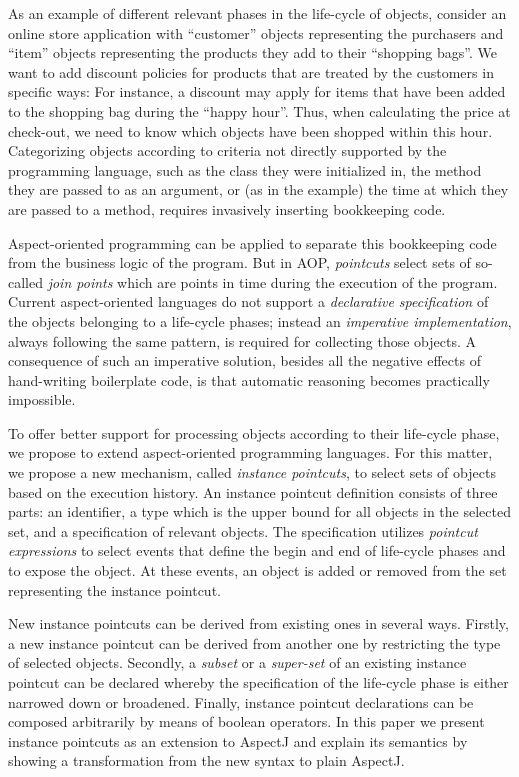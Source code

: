 As an example of different relevant phases in the life-cycle of objects, consider an online store application with ``customer'' objects representing the purchasers and ``item'' objects representing the products they add to their ``shopping bags''. We want to add discount policies for products that are treated by the customers in specific ways: For instance, a discount may apply for items that have been added to the shopping bag during the ``happy hour''. Thus, when calculating the price at check-out, we need to know which objects have been shopped within this hour.
Categorizing objects according to criteria not directly supported by the programming language, such as the class they were initialized in, the method they are passed to as an argument, or (as in the example) the time at which they are passed to a method, requires invasively inserting bookkeeping code.

Aspect-oriented programming can be applied to separate this bookkeeping code from the business logic of the program. But in AOP, \emph{pointcuts} select sets of so-called \emph{join points} which are points in time during the execution of the program. Current aspect-oriented languages do not support a \emph{declarative specification} of the objects belonging to a life-cycle phases; instead an \emph{imperative implementation}, always following the same pattern, is required for collecting those objects.
A consequence of such an imperative solution, besides all the negative effects of hand-writing boilerplate code, is that automatic reasoning becomes practically impossible. 

To offer better support for processing objects according to their life-cycle phase, we propose to extend aspect-oriented programming languages.
For this matter, we propose a new mechanism, called \emph{instance pointcuts}, to select sets of objects based on the execution history.
An instance pointcut definition consists of three parts: an identifier, a type which is the upper bound for all objects in the selected set, and a specification of relevant objects.
The specification utilizes \emph{pointcut expressions} to select events that define the begin and end of life-cycle phases and to expose the object. At these events, an object is added or removed from the set representing the instance pointcut.

New instance pointcuts can be derived from existing ones in several ways. Firstly, a new instance pointcut can be derived from another one by restricting the type of selected objects. Secondly, a \emph{subset} or a \emph{super-set} of an existing instance pointcut can be declared whereby the specification of the life-cycle phase is either narrowed down or broadened. Finally, instance pointcut declarations can be composed arbitrarily by means of boolean operators. In this paper we present instance pointcuts as an extension to AspectJ \cite{kiczales2001overview} and explain its semantics by showing a transformation from the new syntax to plain AspectJ.

